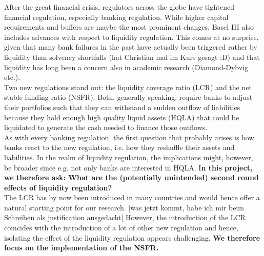 After the great financial crisis, regulators across the globe have tightened financial regulation, especially banking regulation. While higher capital requirements and buffers are maybe the most prominent changes, Basel III also includes advances with respect to liquidity regulation. This comes at no surprise, given that many bank failures in the past have actually been triggered rather by liquidity than solvency shortfalls (hat Christian mal im Kurs gesagt :D) and that liquidity has long been a concern also in academic research (Diamond-Dybvig etc.).\\

Two new regulations stand out: the liquidity coverage ratio (LCR) and the net stable funding ratio (NSFR). Both, generally speaking, require banks to adjust their portfolios such that they can withstand a sudden outflow of liabilities because they hold enough high quality liquid assets (HQLA) that could be liquidated to generate the cash needed to finance those outflows.\\

As with every banking regulation, the first question that probably arises is how banks react to the new regulation, i.e. how they reshuffle their assets and liabilities. In the realm of liquidity regulation, the implications might, however, be broader since e.g. not only banks are interested in HQLA. I\textbf{n this project, we therefore ask: What are the (potentially unintended) second round effects of liquidity regulation?} \\

The LCR has by now been introduced in many countries and would hence offer a natural starting point for our research. [was jetzt kommt, habe ich mir beim Schreiben als justification ausgedacht] However, the introduction of the LCR coincides with the introduction of a lot of other new regulation and hence, isolating the effect of the liquidity regulation appears challenging. \textbf{We therefore focus on the implementation of the NSFR.}\\ 